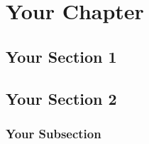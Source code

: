 \chapter{Your Chapter}
\section{Your Section 1}
\section{Your Section 2}
\subsection{Your Subsection}